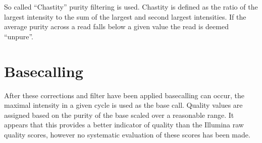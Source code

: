 \documentclass{report}
\begin{document}
So called ``Chastity'' purity filtering is used. Chastity is defined as the ratio of the largest intensity to the sum of the largest and second largest intensities. If the average purity across a read falls below a given value the read is deemed ``unpure''.

\section{Basecalling}

After these corrections and filter have been applied basecalling can occur, the maximal intensity in a given cycle is used as the base call. Quality values are assigned based on the purity of the base scaled over a reasonable range. It appears that this provides a better indicator of quality than the Illumina raw quality scores, however no systematic evaluation of these scores has been made.
\end{document}
